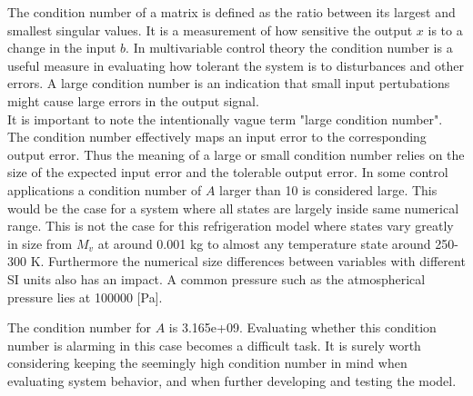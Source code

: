 The condition number of a matrix is defined as the ratio between its largest and smallest singular values. It is a measurement of how sensitive the output $x$ is to a change in the input $b$. In multivariable control theory the condition number is a useful measure in evaluating how tolerant the system is to disturbances and other errors. A large condition number is an indication that small input pertubations might cause large errors in the output signal.\\

It is important to note the intentionally vague term "large condition number". The condition number effectively maps an input error to the corresponding output error. Thus the meaning of a large or small condition number relies on the size of the expected input error and the tolerable output error. In some control applications a condition number of $A$ larger than 10 is considered large. This would be the case for a system where all states are largely inside same numerical range. This is not the case for this refrigeration model where states vary greatly in size from $M_v$ at around 0.001 \si{kg} to almost any temperature state around 250-300 \si{K}. Furthermore the numerical size differences between variables with different SI units also has an impact. A common pressure such as the atmospherical pressure lies at 100000 [Pa].

The condition number for $A$ is 3.165e+09. Evaluating whether this condition number is alarming in this case becomes a difficult task. It is surely worth considering keeping the seemingly high condition number in mind when evaluating system behavior, and when further developing and testing the model.
